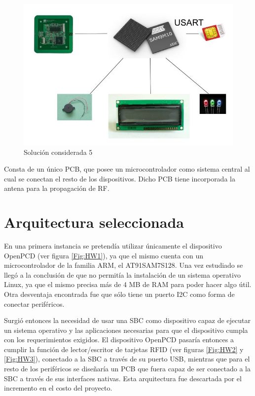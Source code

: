 \begin{itemize}
\begin{figure}[H]
\centering
  \begin{center}
  \includegraphics[scale=.25]{Imagenes/4.jpg} 
  \end{center}
  \caption{Solución considerada 5}\label{Fig:HW5} 
\end{figure}

Consta de un único PCB, que posee un microcontrolador como sistema central al cual se
conectan el resto de los dispositivos. Dicho PCB tiene incorporada la antena para la
propagación de RF.

\end{itemize}

\section{Arquitectura seleccionada}
En una primera instancia se pretendía utilizar únicamente el dispositivo OpenPCD (ver figura \ref{Fig:HW1}), ya que el mismo cuenta con un microcontrolador de la familia ARM, el AT91SAM7S128. Una vez estudiado se llegó a la conclusión de que no permitía la instalación de un sistema operativo Linux, ya que el mismo precisa más de 4 MB de RAM para poder hacer algo útil. Otra desventaja encontrada fue que sólo tiene un puerto I2C como forma de conectar periféricos.

Surgió entonces la necesidad de usar una SBC como dispositivo capaz de ejecutar un sistema operativo y las aplicaciones necesarias para que el dispositivo cumpla con los requerimientos exigidos. El dispositivo OpenPCD pasaría entonces a cumplir la función de lector/escritor de tarjetas RFID (ver figuras \ref{Fig:HW2} y \ref{Fig:HW3}), conectado a la SBC a través de su puerto USB, mientras que para el resto de los periféricos se diseñaría un PCB que fuera capaz de ser conectado a la SBC a través de sus interfaces nativas. Esta arquitectura fue descartada por el incremento en el costo del proyecto.

